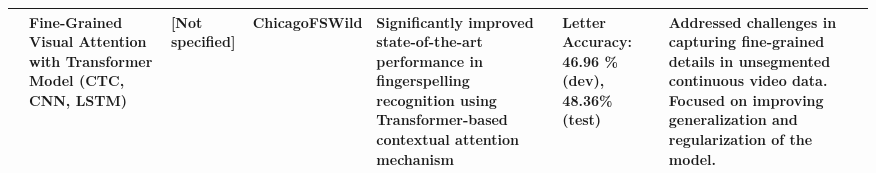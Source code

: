 \begin{footnotesize}
\begin{longtable}{LLLLLLL}
        \cite{gajurelFineGrainedVisualAttention2021}       & Fine-Grained Visual Attention with Transformer Model (CTC, CNN, LSTM)                                                 & [Not specified]          & ChicagoFSWild                  & Significantly improved state-of-the-art performance in fingerspelling recognition using Transformer-based contextual attention mechanism                  & Letter Accuracy: 46.96 \% (dev), 48.36\% (test)        & Addressed challenges in capturing fine-grained details in unsegmented continuous video data. Focused on improving generalization and regularization of the model.       \\

        \bottomrule
    \end{longtable}
\end{footnotesize}